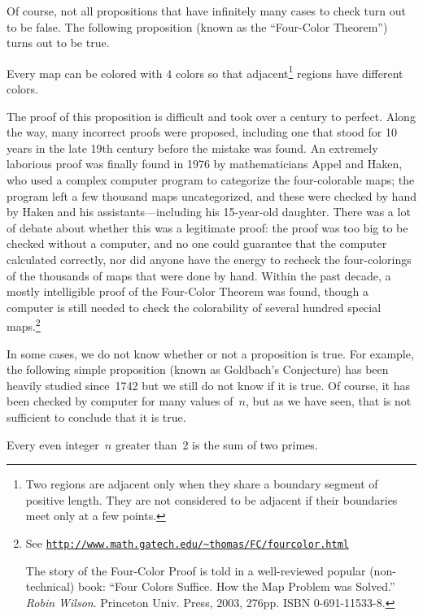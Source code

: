 Of course, not all propositions  that have infinitely many cases to
check turn out to be
false.  The following proposition (known as the ``Four-Color
Theorem'') turns out to be true.
\begin{proposition}\label{4colorprop}
Every map can be colored with 4 colors so that adjacent\footnote{Two
  regions are adjacent only when they share a boundary segment of
  positive length.  They are not considered to be adjacent if their
  boundaries meet only at a few points.} regions have different
colors.
\end{proposition}
The proof of this proposition is difficult and took over a century to
perfect.  Along the way, many incorrect proofs were proposed,
including one that stood for 10 years in the late 19th century before
the mistake was found.  An extremely laborious proof was finally found
in 1976 by mathematicians Appel and Haken, who used a complex computer
program to categorize the four-colorable maps; the program left a few
thousand maps uncategorized, and these were checked by hand by Haken
and his assistants---including his 15-year-old daughter.  There was a
lot of debate about whether this was a legitimate proof: the proof was
too big to be checked without a computer, and no one could guarantee
that the computer calculated correctly, nor did anyone have the energy
to recheck the four-colorings of the thousands of maps that were done by
hand.  Within the past decade, a mostly intelligible proof of the
Four-Color Theorem was found, though a computer is still needed to
check the colorability of several hundred special maps.\footnote{See
\href{http://www.math.gatech.edu/~thomas/FC/fourcolor.html}
{\texttt{http://www.math.gatech.edu/\~{}thomas/FC/fourcolor.html}}

The story of the Four-Color Proof is told in a well-reviewed
  popular (non-technical) book: ``Four Colors Suffice.  How the Map
  Problem was Solved.'' \emph{Robin Wilson}.  Princeton Univ. Press, 2003,
  276pp. ISBN 0-691-11533-8.}

In some cases, we do not know whether or not a proposition is true.
For example, the following simple proposition (known as Goldbach's
Conjecture) has been heavily studied since~1742 but we still do not
know if it is true.  Of course, it has been checked by computer for
many values of~$n$, but as we have seen, that is not sufficient to
conclude that it is true.
\begin{proposition}[Goldbach]
Every even integer~$n$ greater than~2 is the sum of two primes.
\end{proposition}

